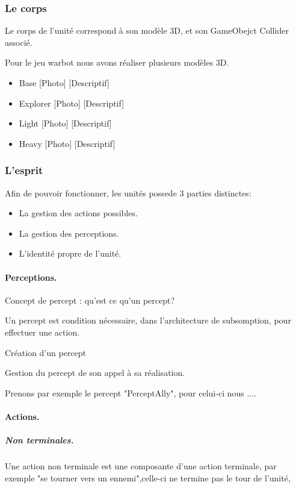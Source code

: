 \documentclass{report}
\begin{document}
\subsubsection{Le corps}

Le corps de l'unité correspond à son modèle 3D, et son GameObejct Collider associé.

Pour le jeu warbot nous avons réaliser plusieurs modèles 3D.
\begin{itemize}
\item Base
[Photo]
[Descriptif]
\item Explorer
[Photo]
[Descriptif]
\item Light
[Photo]
[Descriptif]
\item Heavy
[Photo]
[Descriptif]
\end{itemize}

\subsubsection{L'esprit}
Afin de pouvoir fonctionner, les unités possede 3 parties distinctes: 
\begin{itemize}
\item La gestion des actions possibles.
\item La gestion des perceptions.
\item L'identité propre de l'unité.
\end{itemize}

\paragraph{Perceptions.}
Concept de percept : qu'est ce qu'un percept?

Un percept est condition nécessaire, dans l'architecture de subsomption, pour effectuer une action.

Création d'un percept

Gestion du percept de son appel à sa réalisation.

Prenons par exemple le percept "PerceptAlly", pour celui-ci nous ....

\paragraph{Actions.}

\subparagraph{Non terminales.}

Une action non terminale est une composante d'une action terminale, par exemple "se tourner vers un ennemi",celle-ci ne termine pas le tour de l'unité, 
\end{document}
